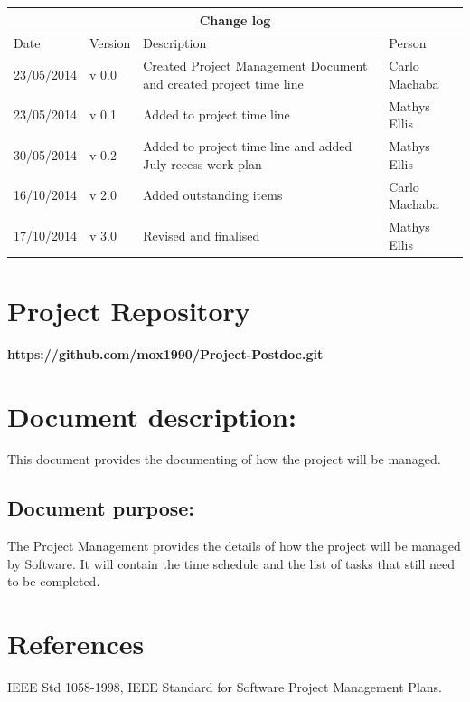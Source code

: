 \documentclass[12pt]{article}
\newcommand{\repo}{https://github.com/mox1990/Project-Postdoc.git}
\begin{document}
\begin{center}
\begin{tabular}{|l|p{1.4cm}|p{8cm}|p{2.8cm}|}
\hline
\multicolumn{4}{|c|}{\bf Change log} \\
\hline
 Date & Version & Description &  Person \\
\hline
23/05/2014 & v 0.0 & Created Project Management Document and created project time line & Carlo Machaba \\
\hline
23/05/2014 & v 0.1 & Added to project time line & Mathys Ellis \\
\hline
30/05/2014 & v 0.2 & Added to project time line and added July recess work plan & Mathys Ellis \\
\hline
16/10/2014 & v 2.0 & Added outstanding items & Carlo Machaba \\
\hline
17/10/2014 & v 3.0 & Revised and finalised & Mathys Ellis \\
\hline

\end{tabular}
\end{center}
\newpage
\tableofcontents

\listoffigures
\newpage
\section{Project Repository}
\textbf{\repo}
\newpage
\section{Document description:}
This document provides the documenting of how the project will be managed.

\subsection{Document purpose:}
\vspace{0.2in}
The Project Management provides the details of how the project will be managed by Software. It will contain the time schedule and the list of tasks that still need to be completed.

\section{References}
IEEE Std 1058-1998, IEEE Standard for Software Project Management Plans.

\vspace{0.2in}
\end{document}
